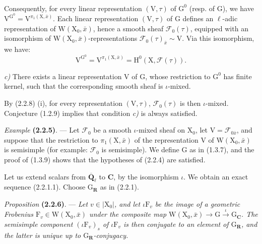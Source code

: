 \documentclass[11pt,leqno]{article}
\newcommand{\Page}[1]{\ifvmode\noindent\else\unskip\ \fi{\footnotesize\textcolor{gray}{[p.\,#1]}}\ \ignorespaces}
\begin{document}
\Page{194}

Consequently, for every linear representation \((\mathrm V,\tau)\) of \(\mathrm G^0\) (resp. of \(\mathrm G\)), we have \(\mathrm V^{\mathrm G^0}=\mathrm V^{\pi_1(\mathrm X,\bar{x})}\). Each linear representation \((\mathrm V,\tau)\) of \(\mathrm G\) defines an \(\ell\)-adic representation of \(\mathrm W(\mathrm X_0,\bar{x})\), hence a smooth sheaf \(\mathscr F_0(\tau)\), equipped with an isomorphism of \(\mathrm W(\mathrm X_0,\bar{x})\)-representations \(\mathscr F_0(\tau)_{\bar{x}}\sim\mathrm V\). Via this isomorphism, we have:
\[
\mathrm V^{\mathrm G^0}
=\mathrm V^{\pi_1(\mathrm X,\bar{x})}
=\mathrm H^0(\mathrm X,\mathscr F(\tau)).
\]

\textit{c)} There exists a linear representation \(\mathrm V\) of \(\mathrm G\), whose restriction to \(\mathrm G^0\) has finite kernel, such that the corresponding smooth sheaf is \(\iota\)-mixed.

By (2.2.8) (i), for every representation \((\mathrm V,\tau)\), \(\mathscr F_0(\tau)\) is then \(\iota\)-mixed. Conjecture (1.2.9) implies that condition \textit{c)} is always satisfied.

\textit{Example} \textbf{(2.2.5)}. — Let \(\mathscr F_0\) be a smooth \(\iota\)-mixed sheaf on \(\mathrm X_0\), let \(\mathrm V=\mathscr F_{0\bar{x}}\), and suppose that the restriction to \(\pi_1(\mathrm X,\bar{x})\) of the representation \(\mathrm V\) of \(\mathrm W(\mathrm X_0,\bar{x})\) is semisimple (for example: \(\mathscr F_0\) is semisimple). We define \(\mathrm G\) as in (1.3.7), and the proof of (1.3.9) shows that the hypotheses of (2.2.4) are satisfied.

Let us extend scalars from \(\overline{\mathbf Q}_\ell\) to \(\mathbf C\), by the isomorphism \(\iota\). We obtain an exact sequence (2.2.1.1). Choose \(\mathrm G_{\mathbf R}\) as in (2.2.1).

\textit{Proposition} \textbf{(2.2.6)}. — \textit{Let \(v\in|\mathrm X_0|\), and let \(\iota\mathrm F_v\) be the image of a geometric Frobenius \(\mathrm F_v\in\mathrm W(\mathrm X_0,\bar{x})\) under the composite map \(\mathrm W(\mathrm X_0,\bar{x})\to\mathrm G\xrightarrow{\iota}\mathrm G_{\mathbf C}\). The semisimple component \((\iota\mathrm F_v)_s\) of \(\iota\mathrm F_v\) is then conjugate to an element of \(\mathrm G_{\mathbf R}\), and the latter is unique up to \(\mathrm G_{\mathbf R}\)-conjugacy.}
\end{document}
